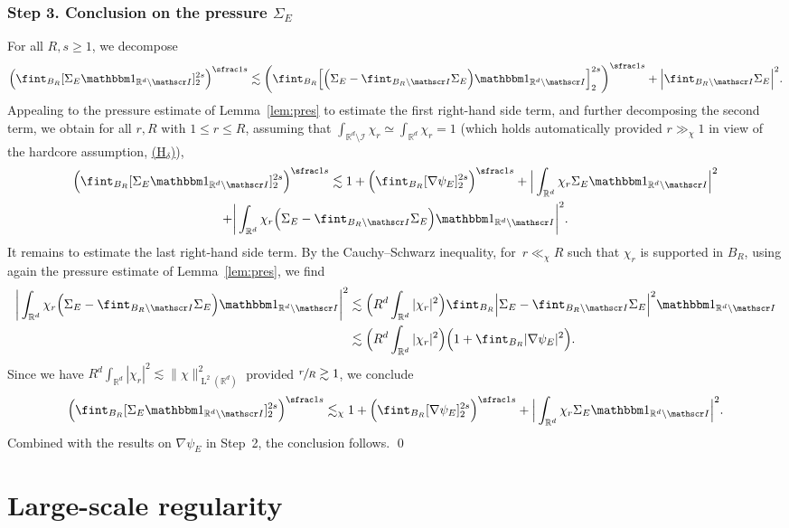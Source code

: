 \documentclass[JEP,XML,SOM,Unicode,published]{cedram}
\let\mathcal\mathscr
\newcounter{assumption}
\newcommand{\Hd}{\hyperref[Hd]{\textup{(H$_\delta$)}}\xspace}
\let\mathds\mathbbm
\theoremstyle{plain}
\theoremstyle{definition}
\newcommand{\R}{\mathbb R}
\newcommand{\Ic}{\mathcal I}
\newcommand{\Ld}{\operatorname{L}}
\newcommand{\step}[1]{\subsubsection*{Step #1}}
\begin{document}
\step{3. Conclusion on the pressure $\Sigma_E$}
For all $R,s\ge1$,
we decompose
\begin{equation*}
\Big(\fint_{B_R}[\Sigma_E\mathds1_{\R^d\setminus\Ic}]_2^{2s}\Big)^{\sfrac1s}\lesssim 
\bigg(\fint_{B_R}\Big[\Big(\Sigma_E-\fint_{B_R\setminus\Ic}\Sigma_E\Big)\mathds1_{\R^d\setminus\Ic}\Big]_2^{2s}\bigg)^{\sfrac1s}+\Big|\fint_{B_R\setminus\Ic}\Sigma_E\Big|^2.
\end{equation*}
Appealing to the pressure estimate of Lemma~\ref{lem:pres} to estimate the first right-hand side term,
and further decomposing the second term, we obtain for all $r,R$ with $1\le r\le R$, assuming that $\int_{\R^d\setminus\Ic}\chi_r\simeq\int_{\R^d}\chi_r=1$ (which holds automatically provided $r\gg_\chi1$ in view of the hardcore assumption, \cf \Hd),
\begin{multline*}
\Big(\fint_{B_R}[\Sigma_E\mathds1_{\R^d\setminus\Ic}]_2^{2s}\Big)^{\sfrac1s}\lesssim 1+
\Big(\fint_{B_R}[\nabla\psi_E]_2^{2s}\Big)^{\sfrac1s}+\Big|\int_{\R^d}\chi_r\Sigma_E\mathds1_{\R^d\setminus\Ic}\Big|^2\\
+\bigg|\int_{\R^d}\chi_r\Big(\Sigma_E-\fint_{B_R\setminus\Ic}\Sigma_E\Big)\mathds1_{\R^d\setminus\Ic}\bigg|^2.
\end{multline*}
It remains to estimate the last right-hand side term. By the Cauchy--Schwarz inequality, for~$r\ll_\chi R$ such that $\chi_r$ is supported in $B_R$, using again the pressure estimate of Lemma~\ref{lem:pres}, we find
\begin{align*}
\bigg|\int_{\R^d}\chi_r\Big(\Sigma_E-\fint_{B_R\setminus\Ic}\Sigma_E\Big)\mathds1_{\R^d\setminus\Ic}\bigg|^2&\lesssim \Big(R^d\int_{\R^d}|\chi_r|^2\Big)\fint_{B_R}\Big|\Sigma_E-\fint_{B_R\setminus\Ic}\Sigma_E\Big|^2\mathds1_{\R^d\setminus\Ic}\\
&\lesssim \Big(R^d\int_{\R^d}|\chi_r|^2\Big)\Big(1+\fint_{B_R}|\nabla\psi_E|^2\Big).
\end{align*}
Since we have $R^d\int_{\R^d}|\chi_r|^2\lesssim\|\chi\|_{\Ld^2(\R^d)}^2$ provided $\sfrac rR\gtrsim1$, we conclude
\begin{equation*}
\Big(\fint_{B_R}[\Sigma_E\mathds1_{\R^d\setminus\Ic}]_2^{2s}\Big)^{\sfrac1s}\lesssim_\chi 1+
\Big(\fint_{B_{R}}[\nabla\psi_E]_2^{2s}\Big)^{\sfrac1s}+\Big|\int_{\R^d}\chi_r\Sigma_E\mathds1_{\R^d\setminus\Ic}\Big|^2.
\end{equation*}
Combined with the results on $\nabla\psi_E$ in Step~2, the conclusion follows.
\qed

\section{Large-scale regularity}\label{sec:reg}
\end{document}
